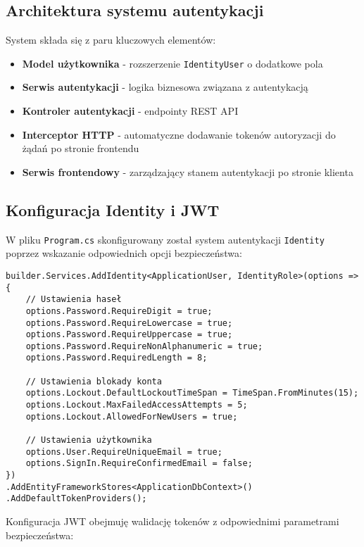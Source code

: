 \subsection{Architektura systemu autentykacji}
System składa się z paru kluczowych elementów:
\begin{itemize}
	\item \textbf{Model użytkownika} - rozszerzenie \texttt{IdentityUser} o dodatkowe pola
	\item \textbf{Serwis autentykacji} - logika biznesowa związana z autentykacją
	\item \textbf{Kontroler autentykacji} - endpointy REST API
	\item \textbf{Interceptor HTTP} - automatyczne dodawanie tokenów autoryzacji do żądań po stronie frontendu
	\item \textbf{Serwis frontendowy} - zarządzający stanem autentykacji po stronie klienta
\end{itemize}

\subsection{Konfiguracja Identity i JWT}
W pliku \texttt{Program.cs} skonfigurowany został system autentykacji \texttt{Identity} poprzez wskazanie odpowiednich opcji bezpieczeństwa:

\begin{lstlisting}[style=csharp, caption={Konfiguracja bezpieczeństwa w Program.cs}]
builder.Services.AddIdentity<ApplicationUser, IdentityRole>(options =>
{
	// Ustawienia haseł
	options.Password.RequireDigit = true;
	options.Password.RequireLowercase = true;
	options.Password.RequireUppercase = true;
	options.Password.RequireNonAlphanumeric = true;
	options.Password.RequiredLength = 8;
	
	// Ustawienia blokady konta
	options.Lockout.DefaultLockoutTimeSpan = TimeSpan.FromMinutes(15);
	options.Lockout.MaxFailedAccessAttempts = 5;
	options.Lockout.AllowedForNewUsers = true;
	
	// Ustawienia użytkownika
	options.User.RequireUniqueEmail = true;
	options.SignIn.RequireConfirmedEmail = false;
})
.AddEntityFrameworkStores<ApplicationDbContext>()
.AddDefaultTokenProviders();
\end{lstlisting}

Konfiguracja JWT obejmuję walidację tokenów z odpowiednimi parametrami bezpieczeństwa:

